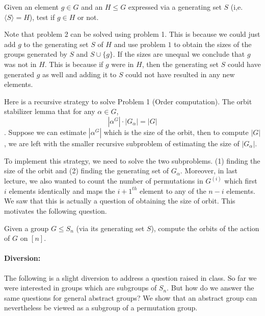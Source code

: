 
\begin{problem}
	Given an element  $g \in G$ and an $H \le G$ expressed via a
	generating set $S$ (i,e. $\langle S \rangle = H$), test if $g \in H$
	or not.
\end{problem}

Note that problem 2 can be solved using problem 1. This is because we could just add $g$ to the generating set $S$ of $H$ and use problem $1$ to obtain the sizes of the groups generated by $S$ and $S \cup \{g\}$. If the sizes are
unequal we conclude that $g$ was not in $H$. This is because if $g$ were in
$H$, then the generating set $S$ could have generated $g$ as well and adding
it to $S$ could not have resulted in any new elements.  

Here is a recursive strategy to solve Problem 1 (Order computation). The orbit stabilizer lemma that for any $\alpha \in  G$, $$|\alpha^{G}|\cdot |G_{\alpha}| = |G|$$. Suppose we can estimate $|\alpha^{G}|$ which is the size of the orbit, then to compute $|G|$, we are left with the smaller recursive subproblem of estimating the size of $|G_{\alpha}|$. 

To implement this strategy, we need to solve the two subproblems. (1) finding the size of the orbit and (2) finding the generating set of $G_\alpha$. Moreover, in last lecture, we also wanted to count the number of permutations in $G^{(i)}$ which first $i$ elements identically and maps the $i+1^{th}$ element
to any of the $n-i$ elements. We saw that this is actually a question of obtaining the size of orbit. This motivates the following question.

\begin{problem} 
Given a group $G \le S_{n}$ (via its generating set $S$), compute the orbits of the action of $G$ on $[n]$.
\end{problem}

\paragraph{Diversion:}
The following is a slight diversion to address a question raised in class. So far we were interested in groups which are subgroups of $S_n$. But how do we answer the same questions for general abstract groups? We show that an abstract group can nevertheless be viewed as a subgroup of a permutation group. 

